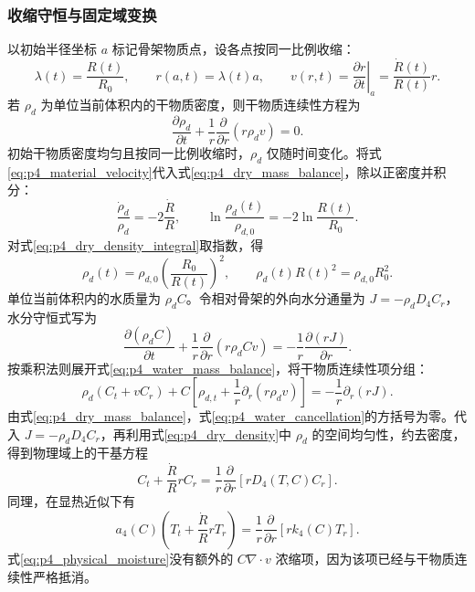 \documentclass[withoutpreface,bwprint]{cumcmthesis}
\begin{document}
\subsubsection{收缩守恒与固定域变换}

以初始半径坐标 $a$ 标记骨架物质点，设各点按同一比例收缩：
\begin{equation}
\lambda(t)=\frac{R(t)}{R_0},\qquad
r(a,t)=\lambda(t)a,\qquad
v(r,t)=\left.\frac{\partial r}{\partial t}\right|_a
=\frac{\dot R(t)}{R(t)}r.
\label{eq:p4_material_velocity}
\end{equation}
若 $\rho_d$ 为单位当前体积内的干物质密度，则干物质连续性方程为
\begin{equation}
\frac{\partial\rho_d}{\partial t}
+\frac{1}{r}\frac{\partial}{\partial r}(r\rho_dv)=0.
\label{eq:p4_dry_mass_balance}
\end{equation}
初始干物质密度均匀且按同一比例收缩时，$\rho_d$ 仅随时间变化。将式\eqref{eq:p4_material_velocity}代入式\eqref{eq:p4_dry_mass_balance}，除以正密度并积分：
\begin{equation}
\frac{\dot\rho_d}{\rho_d}=-2\frac{\dot R}{R},
\qquad
\ln\frac{\rho_d(t)}{\rho_{d,0}}=-2\ln\frac{R(t)}{R_0}.
\label{eq:p4_dry_density_integral}
\end{equation}
对式\eqref{eq:p4_dry_density_integral}取指数，得
\begin{equation}
\rho_d(t)=\rho_{d,0}\left(\frac{R_0}{R(t)}\right)^2,
\qquad \rho_d(t)R(t)^2=\rho_{d,0}R_0^2.
\label{eq:p4_dry_density}
\end{equation}
单位当前体积内的水质量为 $\rho_dC$。令相对骨架的外向水分通量为 $J=-\rho_dD_4C_r$，水分守恒式写为
\begin{equation}
\frac{\partial(\rho_dC)}{\partial t}
+\frac{1}{r}\frac{\partial}{\partial r}(r\rho_dCv)
=-\frac{1}{r}\frac{\partial(rJ)}{\partial r}.
\label{eq:p4_water_mass_balance}
\end{equation}
按乘积法则展开式\eqref{eq:p4_water_mass_balance}，将干物质连续性项分组：
\begin{equation}
\rho_d(C_t+vC_r)
+C\left[\rho_{d,t}+\frac1r\partial_r(r\rho_dv)\right]
=-\frac1r\partial_r(rJ).
\label{eq:p4_water_cancellation}
\end{equation}
由式\eqref{eq:p4_dry_mass_balance}，式\eqref{eq:p4_water_cancellation}的方括号为零。代入 $J=-\rho_dD_4C_r$，再利用式\eqref{eq:p4_dry_density}中 $\rho_d$ 的空间均匀性，约去密度，得到物理域上的干基方程
\begin{equation}
C_t+\frac{\dot R}{R}rC_r
=\frac{1}{r}\frac{\partial}{\partial r}\left[rD_4(T,C)C_r\right].
\label{eq:p4_physical_moisture}
\end{equation}
同理，在显热近似下有
\begin{equation}
a_4(C)\left(T_t+\frac{\dot R}{R}rT_r\right)
=\frac{1}{r}\frac{\partial}{\partial r}\left[rk_4(C)T_r\right].
\label{eq:p4_physical_heat}
\end{equation}
式\eqref{eq:p4_physical_moisture}没有额外的 $C\nabla\!\cdot v$ 浓缩项，因为该项已经与干物质连续性严格抵消。
\end{document}
